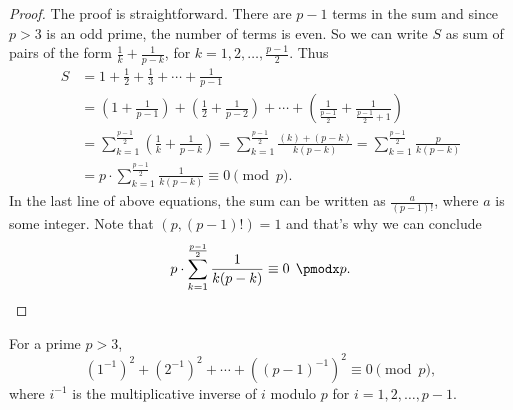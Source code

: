 \documentclass[12pt]{subfile}
\begin{document}
		\begin{proof}
			The proof is straightforward. There are $p-1$ terms in the sum and since $p>3$ is an odd prime, the number of terms is even. So we can write $S$ as sum of pairs of the form $ \frac{1}{k} +‌\frac{1}{p-k}$, for $k=1, 2, \ldots, \frac{p-1}{2}$. Thus
			\begin{align*}
				S &= 1+\frac{1}{2}+ \frac{1}{3}+\cdots+ \frac{1}{p-1}\\
				&= \left(1 + \frac{1}{p-1}\right) +‌\left(\frac{1}{2} + \frac{1}{p-2}\right) + \cdots + \left(\frac{1}{\frac{p-1}{2}} + \frac{1}{\frac{p-1}{2}+1}\right)\\
				&= \sum_{k=1}^{\frac{p-1}{2}} \left(\frac{1}{k}+\frac{1}{p-k} \right) = \sum_{k=1}^{\frac{p-1}{2}} \frac{(k) + (p-k)}{k(p-k)} = \sum_{k=1}^{\frac{p-1}{2}} \frac{p}{k(p-k)}\\
				&=p \cdot \sum_{k=1}^{\frac{p-1}{2}} \frac{1}{k(p-k)} \equiv 0 \pmod p.
			\end{align*}
			In the last line of above equations, the sum can be written as $\frac{a}{(p-1)!}$, where $a$ is some integer. Note that $(p, (p-1)!)=1$ and that's why we can conclude
				\begin{equation*}
					p \cdot \sum_{k=1}^{\frac{p-1}{2}} \frac{1}{k(p-k)} \equiv 0 \pmod p. \qedhere
				\end{equation*}
		\end{proof}
		
		\begin{lemma}\label{lem:wolstproof2} For a prime $p>3$,
			\[(1^{-1})^2+(2^{-1})^2+\cdots+((p-1)^{-1})^2 \equiv 0 \pmod p,\] where $i^{-1}$ is the multiplicative inverse of $i$ modulo $p$ for $i=1,2,\ldots,p-1$.
		\end{lemma}
		
\end{document}
